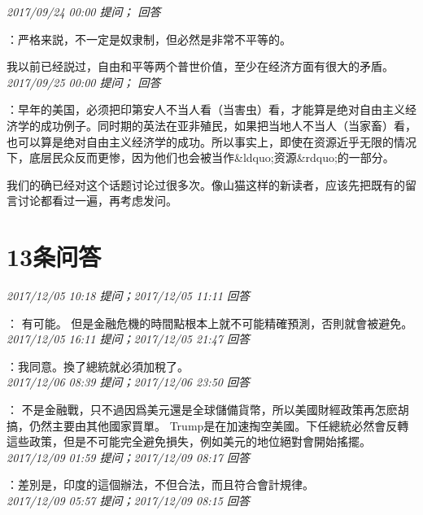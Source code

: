 \documentclass[twocolumn]{ctexart}
\begin{document}
\textit{\hfill\noindent\small 2017/09/24 00:00 提问； 回答}

：严格来説，不一定是奴隶制，但必然是非常不平等的。

我以前已经説过，自由和平等两个普世价值，至少在经济方面有很大的矛盾。\\

\textit{\hfill\noindent\small 2017/09/25 00:00 提问； 回答}

：早年的美国，必须把印第安人不当人看（当害虫）看，才能算是绝对自由主义经济学的成功例子。同时期的英法在亚非殖民，如果把当地人不当人（当家畜）看，也可以算是绝对自由主义经济学的成功。所以事实上，即使在资源近乎无限的情况下，底层民众反而更惨，因为他们也会被当作\&ldquo;资源\&rdquo;的一部分。

我们的确已经对这个话题讨论过很多次。像山猫这样的新读者，应该先把既有的留言讨论都看过一遍，再考虑发问。\\

\section{13条问答}

\textit{\hfill\noindent\small 2017/12/05 10:18 提问；2017/12/05 11:11 回答}

：
有可能。
但是金融危機的時間點根本上就不可能精確預測，否則就會被避免。
\\

\textit{\hfill\noindent\small 2017/12/05 16:11 提问；2017/12/05 21:47 回答}

：我同意。換了總統就必須加稅了。
\\

\textit{\hfill\noindent\small 2017/12/06 08:39 提问；2017/12/06 23:50 回答}

：
不是金融戰，只不過因爲美元還是全球儲備貨幣，所以美國財經政策再怎麽胡搞，仍然主要由其他國家買單。
Trump是在加速掏空美國。下任總統必然會反轉這些政策，但是不可能完全避免損失，例如美元的地位絕對會開始搖擺。
\\

\textit{\hfill\noindent\small 2017/12/09 01:59 提问；2017/12/09 08:17 回答}

：差別是，印度的這個辦法，不但合法，而且符合會計規律。
\\

\textit{\hfill\noindent\small 2017/12/09 05:57 提问；2017/12/09 08:15 回答}
\end{document}
